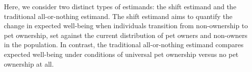 \documentclass[
  singlecolumn,
  9pt]{article}
\begin{document}
\newpage{}

\begin{table}

\caption{\label{tbl-comparative-graph-cats}A comparison of the classical
causal estimand with the shift estimand employed in this study: cats and
sleep}


\end{table}%

\newpage{}

Here, we consider two distinct types of estimands: the shift estimand
and the traditional all-or-nothing estimand. The shift estimand aims to
quantify the change in expected well-being when individuals transition
from non-ownership to pet ownership, set against the current
distribution of pet owners and non-owners in the population. In
contrast, the traditional all-or-nothing estimand compares expected
well-being under conditions of universal pet ownership versus no pet
ownership at all.
\end{document}
